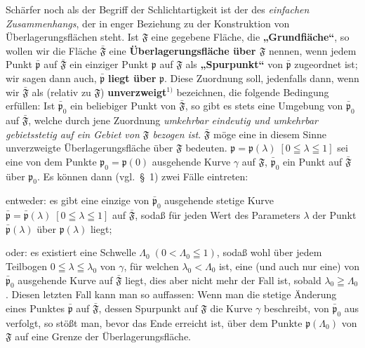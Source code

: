 \documentclass{article}
\begin{document}
Schärfer noch als der Begriff der Schlichtartigkeit ist der des \emph{einfachen Zusammenhangs}, der in enger Beziehung zu der Konstruktion von Überlagerungsflächen steht. Ist $\mathfrak{F}$ eine gegebene Fläche, die \textbf{„Grundfiäche“}, so wollen wir die Fläche $\bar{\mathfrak{F}}$ eine \textbf{Überlagerungsfläche über $\mathfrak{F}$} nennen, wenn jedem Punkt $\bar{\mathfrak{p}}$ auf $\bar{\mathfrak{F}}$ ein einziger Punkt $\mathfrak{p}$ auf $\mathfrak{F}$ als \textbf{„Spurpunkt“} von $\bar{\mathfrak{p}}$ zugeordnet ist; wir sagen dann auch, $\bar{\mathfrak{p}}$ \textbf{liegt über} $\mathfrak{p}$. Diese Zuordnung soll, jedenfalls dann, wenn wir $\bar{\mathfrak{F}}$ als (relativ zu $\mathfrak{F}$) \textbf{unverzweigt}${}^{1)}$ bezeichnen, die folgende Bedingung erfüllen: Ist $\bar{\mathfrak{p}}_0$ ein beliebiger Punkt von $\bar{\mathfrak{F}}$, so gibt es stets eine Umgebung von $\bar{\mathfrak{p}}_0$ auf $\bar{\mathfrak{F}}$, welche durch jene Zuordnung \emph{umkehrbar eindeutig und umkehrbar gebietsstetig auf ein Gebiet von $\mathfrak{F}$ bezogen ist}. $\bar{\mathfrak{F}}$ möge eine in diesem Sinne unverzweigte Überlagerungsfläche über $\mathfrak{F}$ bedeuten. $\mathfrak{p} = \mathfrak{p}(\lambda)\;[0 \leqq \lambda \leqq 1]$ sei eine von dem Punkte $\mathfrak{p}_0 = \mathfrak{p}(0)$ ausgehende Kurve $\gamma$ auf $\mathfrak{F}$, $\bar{\mathfrak{p}}_0$ ein Punkt auf $\bar{\mathfrak{F}}$ über $\mathfrak{p}_0$. Es können dann (vgl.\ §~1) zwei Fälle eintreten:

entweder: es gibt eine einzige von $\bar{\mathfrak{p}}_0$ ausgehende stetige Kurve $\bar{\mathfrak{p}} = \bar{\mathfrak{p}}(\lambda)\;[0 \leqq \lambda \leqq 1]$ auf $\bar{\mathfrak{F}}$, sodaß für jeden Wert des Parameters $\lambda$ der Punkt $\bar{\mathfrak{p}}(\lambda)$ über $\mathfrak{p}(\lambda)$ liegt;

oder: es existiert eine Schwelle $\varLambda_0\;(0 < \varLambda_0 \leqq 1)$, sodaß wohl über jedem Teilbogen $0 \leqq \lambda \leqq \lambda_0$ von $\gamma$, für welchen $\lambda_0 < \varLambda_0$ ist, eine (und auch nur eine) von $\bar{\mathfrak{p}}_0$ ausgehende Kurve auf $\bar{\mathfrak{F}}$ liegt, dies aber nicht mehr der Fall ist, sobald $\lambda_0 \geqq \varLambda_0$. Diesen letzten Fall kann man so auffassen: Wenn man die stetige Änderung eines Punktes $\bar{\mathfrak{p}}$ auf $\bar{\mathfrak{F}}$, dessen Spurpunkt auf $\mathfrak{F}$ die Kurve $\gamma$ beschreibt, von $\bar{\mathfrak{p}}_0$ aus verfolgt, so stößt man, bevor das Ende erreicht ist, über dem Punkte $\mathfrak{p}(\varLambda_0)$ von $\mathfrak{F}$ auf eine Grenze der Überlagerungsfläche.
\end{document}
